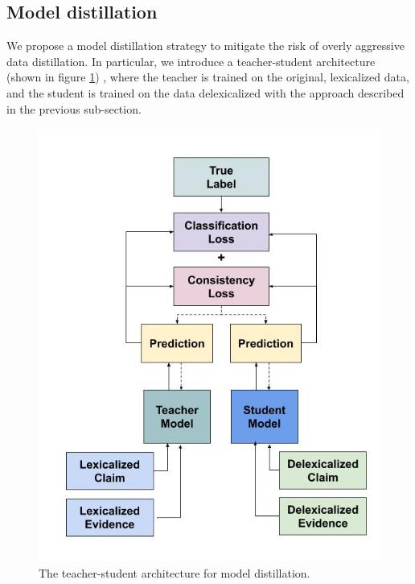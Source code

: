 \subsection{Model distillation}


We propose a model distillation strategy to mitigate the risk of overly aggressive data distillation.
In particular, we introduce a  teacher-student architecture (shown in figure \ref{student_teacher_architecture}) \cite{hinton2015distilling,tarvainen2017mean,laine2016temporal,sajjadi2016regularization}, where the teacher is trained on the original, lexicalized data, and the student is trained on the data delexicalized with the approach described in the previous sub-section.


\begin{figure}[t!]
\center
\includegraphics[width=0.9\linewidth]{mainmatter/naacl21_student_teacher/student_teacher_architecture_color_changed.jpeg}
\caption{ The teacher-student architecture for model distillation.}
\label{student_teacher_architecture}

\end{figure}

